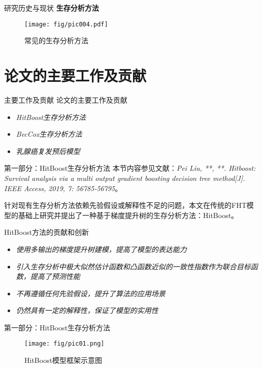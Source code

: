 \documentclass[10pt]{beamer}
\begin{document}
\begin{frame}{研究历史与现状}
  \textbf{生存分析方法}

  \begin{figure}[H]
    \centering
    \texttt{[image: fig/pic004.pdf]}
    \caption{常见的生存分析方法}
  \end{figure}
\end{frame}

\section{论文的主要工作及贡献}

\begin{frame}{主要工作及贡献}
  论文的主要工作及贡献
  \begin{itemize}
    \item \textit{HitBoost生存分析方法}
    \item \textit{BecCox生存分析方法}
    \item \textit{乳腺癌复发预后模型}
  \end{itemize}
\end{frame}

\begin{frame}{第一部分：HitBoost生存分析方法}
  本节内容参见文献：\textit{Pei Liu, **, **. Hitboost: Survival analysis via a multi­ output gradient boosting decision tree method[J]. IEEE Access, 2019, 7: 56785-­56795}。

  针对现有生存分析方法依赖先验假设或解释性不足的问题，本文在传统的FHT模型的基础上研究并提出了一种基于梯度提升树的生存分析方法：HitBoost。
  
  HitBoost方法的贡献和创新
  \begin{itemize}
    \item \textit{使用多输出的梯度提升树建模，提高了模型的表达能力}
    \item \textit{引入生存分析中极大似然估计函数和凸函数近似的一致性指数作为联合目标函数，提高了预测性能}
    \item \textit{不再遵循任何先验假设，提升了算法的应用场景}
    \item \textit{仍然具有一定的解释性，保证了模型的实用性}
  \end{itemize}
  
\end{frame}

\begin{frame}{第一部分：HitBoost生存分析方法}
  \begin{figure}[H]
    \centering
    \texttt{[image: fig/pic01.png]}
    \caption{HitBoost模型框架示意图}
  \end{figure}
  
\end{frame}
\end{document}
